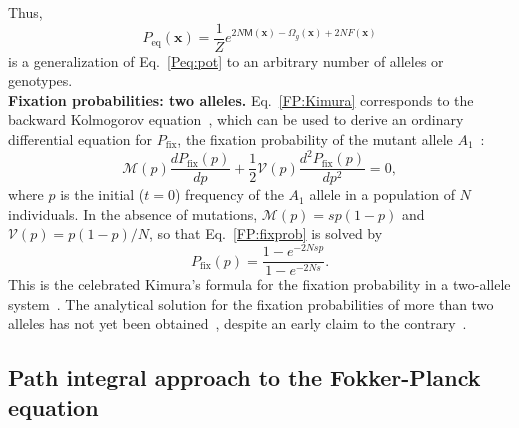 \documentclass[9pt,twocolumn,twoside]{gsajnl}
\begin{document}
Thus,
\begin{equation} \label{Peq:pot:gen}
P_\text{eq} (\mathbf{x}) = \frac{1}{Z} e^{2 N \mathsf{M} (\mathbf{x}) - \Omega_g(\mathbf{x}) + 2 N F(\mathbf{x})}
\end{equation}
is a generalization of Eq.~\eqref{Peq:pot} to an arbitrary number of alleles or genotypes. \\


\noindent
\textbf{Fixation probabilities: two alleles.} Eq.~\eqref{FP:Kimura} corresponds to the backward Kolmogorov equation~\citep{Gardiner2009}, which can be used to derive an ordinary differential equation for $P_\text{fix}$, the fixation
probability of the mutant allele $A_1$~\citep{Weiss1966,Gillespie2004,Crow2009}:
\begin{equation} \label{FP:fixprob}
\mathcal{M} (p) \frac{d P_\text{fix} (p)}{dp} + \frac{1}{2} \mathcal{V} (p) \frac{d^2 P_\text{fix} (p)}{dp^2} = 0,
\end{equation}
where $p$ is the initial ($t=0$) frequency of the $A_1$ allele in a population of $N$ individuals. In the absence of mutations, $\mathcal{M} (p) = sp(1-p)$ and $\mathcal{V} (p) = {p(1-p)}/{N}$, so that
Eq.~\eqref{FP:fixprob} is solved by
\begin{equation} \label{Kimura:fixprob}
P_\text{fix} (p) = \frac{1 - e^{-2Nsp}}{1 - e^{-2Ns}}.
\end{equation}
This is the celebrated Kimura's formula for the fixation probability in a two-allele system~\citep{Kimura1962}. The analytical solution for the fixation probabilities of more than two alleles
has not yet been obtained~\citep{Crow2009}, despite an early claim to the contrary~\citep{Kimura1964}.

\subsection{Path integral approach to the Fokker-Planck equation}
\end{document}
